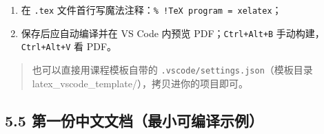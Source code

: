 \begin{Shaded}
\begin{Highlighting}[]
\FunctionTok{\{}
  \FunctionTok{:} \OtherTok{[}
    \FunctionTok{\{} \FunctionTok{:} \FunctionTok{,} \FunctionTok{:} \OtherTok{[}\OtherTok{]} \FunctionTok{\}}
  \OtherTok{]}\FunctionTok{,}
  \FunctionTok{:} \OtherTok{[}
    \FunctionTok{\{}
      \FunctionTok{:} \FunctionTok{,}
      \FunctionTok{:} \FunctionTok{,}
      \FunctionTok{:} \OtherTok{[}\OtherTok{,} \OtherTok{,} \OtherTok{,} \OtherTok{]}
    \FunctionTok{\}}
  \OtherTok{]}\FunctionTok{,}
  \FunctionTok{:} \FunctionTok{,}
  \FunctionTok{:} 
\FunctionTok{\}}
\end{Highlighting}
\end{Shaded}

\begin{enumerate}
\def\labelenumi{\arabic{enumi}.}
\setcounter{enumi}{2}
\tightlist
\item
  在 \texttt{.tex}
  文件首行写魔法注释：\texttt{\%\ !TeX\ program\ =\ xelatex}；
\item
  保存后应自动编译并在 VS Code 内预览 PDF；\texttt{Ctrl+Alt+B}
  手动构建，\texttt{Ctrl+Alt+V} 看 PDF。
\end{enumerate}

\begin{quote}
也可以直接用课程模板自带的 \texttt{.vscode/settings.json}（模板目录
latex\_vscode\_template/），拷贝进你的项目即可。
\end{quote}

\subsection{5.5
第一份中文文档（最小可编译示例）}\label{ux7b2cux4e00ux4efdux4e2dux6587ux6587ux6863ux6700ux5c0fux53efux7f16ux8bd1ux793aux4f8b}

